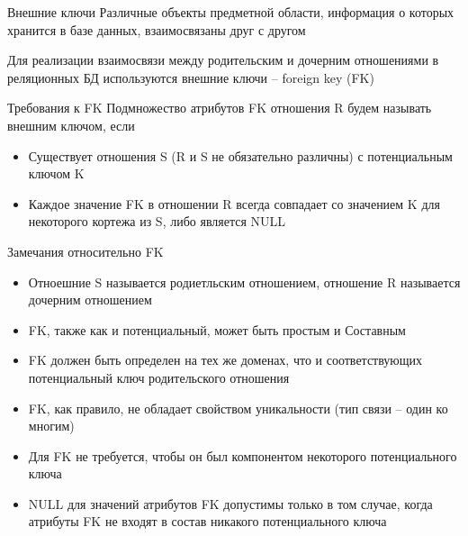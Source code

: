 \documentclass[12pt]{article}
\begin{document}
\begin{defin}{Внешние ключи}
    Различные объекты предметной области, информация о которых хранится в базе данных, взаимосвязаны друг с другом 

    Для реализации взаимосвязи между родительским и дочерним отношениями в реляционных БД используются внешние ключи -- foreign key (FK)
\end{defin}

\begin{nota}{Требования к FK}
    Подмножество атрибутов FK отношения R будем называть внешним ключом, если 

    \begin{itemize}
        \item Существует отношения S (R и S не обязательно различны) с потенциальным ключом K
        \item Каждое значение FK в отношении R всегда совпадает со значением K для некоторого кортежа из S, либо является NULL
    \end{itemize}
\end{nota}

\begin{Remark}{Замечания относительно FK}
    \begin{itemize}
        \item Отноешние S называется родиетльским отношением, отношение R называется дочерним отношением
        \item FK, также как и потенциальный, может быть простым и Составным
        \item FK должен быть определен на тех же доменах, что и соответствующих потенциальный ключ родительского отношения
        \item FK, как правило, не обладает свойством уникальности (тип связи -- один ко многим)
        \item Для FK не требуется, чтобы он был компонентом некоторого потенциального ключа
        \item NULL для значений атрибутов FK допустимы только в том случае, когда атрибуты FK не входят в состав никакого потенциального ключа 
    \end{itemize}
\end{Remark}
\end{document}
